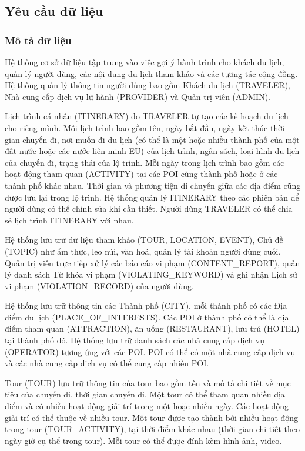 \subsection{Yêu cầu dữ liệu}
\subsubsection{Mô tả dữ liệu}
Hệ thống cơ sở dữ liệu tập trung vào việc gợi ý hành trình cho khách du lịch, quản lý người dùng, các nội dung du lịch tham khảo và các tương tác cộng đồng.
Hệ thống quản lý thông tin người dùng bao gồm Khách du lịch (TRAVELER), Nhà cung cấp dịch vụ lữ hành (PROVIDER) và Quản trị viên (ADMIN).

Lịch trình cá nhân (ITINERARY) do TRAVELER tự tạo các kế hoạch du lịch cho riêng mình. Mỗi lịch trình bao gồm tên, ngày bắt đầu, ngày kết thúc thời gian chuyến đi, nơi muốn đi du lịch (có thể là một hoặc nhiều thành phố của một đất nước hoặc các nước liên minh EU) của lịch trình, ngân sách, loại hình du lịch của chuyến đi, trạng thái của lộ trình. Mỗi ngày trong lịch trình bao gồm các hoạt động tham quan (ACTIVITY) tại các POI cùng thành phố hoặc ở các thành phố khác nhau. Thời gian và phương tiện di chuyển giữa các địa điểm cũng được lưu lại trong lộ trình. Hệ thống quản lý ITINERARY theo các phiên bản để người dùng có thể chỉnh sửa khi cần thiết. Người dùng TRAVELER có thể chia sẻ lịch trình ITINERARY với nhau.

Hệ thống lưu trữ dữ liệu tham khảo (TOUR, LOCATION, EVENT), Chủ đề (TOPIC) như ẩm thực, leo núi, văn hoá, quản lý tài khoản người dùng cuối. Quản trị viên trực tiếp xử lý các báo cáo vi phạm (CONTENT\_REPORT), quản lý danh sách Từ khóa vi phạm (VIOLATING\_KEYWORD) và ghi nhận Lịch sử vi phạm (VIOLATION\_RECORD) của người dùng.

Hệ thống lưu trữ thông tin các Thành phố (CITY), mỗi thành phố có các Địa điểm du lịch (PLACE\_OF\_INTERESTS). Các POI ở thành phố có thể là địa điểm tham quan (ATTRACTION), ăn uống (RESTAURANT), lưu trú (HOTEL) tại thành phố đó. Hệ thống lưu trữ danh sách các nhà cung cấp dịch vụ (OPERATOR) tương ứng với các POI. POI có thể có một nhà cung cấp dịch vụ và các nhà cung cấp dịch vụ có thể cung cấp nhiều POI.

Tour (TOUR) lưu trữ thông tin của tour bao gồm tên và mô tả chi tiết về mục tiêu của chuyến đi, thời gian chuyến đi. Một tour có thể tham quan nhiều địa điểm và có nhiều hoạt động giải trí trong một hoặc nhiều ngày. Các hoạt động giải trí có thể thuộc về nhiều tour. Một tour được tạo thành bởi nhiều hoạt động trong tour (TOUR\_ACTIVITY), tại thời điểm khác nhau (thời gian chi tiết theo ngày-giờ cụ thể trong tour). Mỗi tour có thể được đính kèm hình ảnh, video. 

